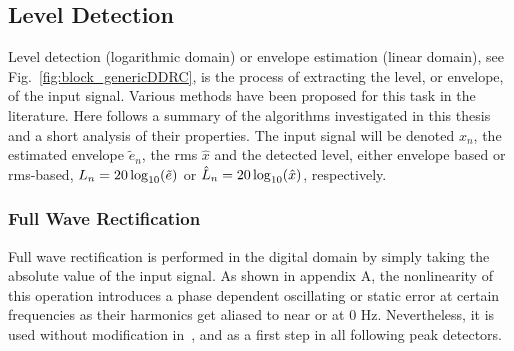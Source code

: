 \documentclass[../main2.tex]{subfiles}
\begin{document}
\subsection{Level Detection}\label{level_detection}
Level detection (logarithmic domain) or envelope estimation (linear domain), see Fig.~\ref{fig:block_genericDDRC}, is the process of extracting the level, or envelope, of the input signal. Various methods have been proposed for this task in the literature. Here follows a summary of the algorithms investigated in this thesis and a short analysis of their properties. The input signal will be denoted $x_n$, the estimated envelope $\tilde{e}_n$, the rms $\hat{x}$ and the detected level, either envelope based or rms-based, $L_n = 20\log_{10}(\tilde{e})$ or $\hat{L}_n=20\log_{10}(\hat{x})$, respectively. 

\subsubsection{Full Wave Rectification}\label{full_wave_rect}
Full wave rectification is performed in the digital domain by simply taking the absolute value of the input signal. As shown in appendix A, the nonlinearity of this operation introduces a phase dependent oscillating or static error at certain frequencies as their harmonics get aliased to near or at 0 Hz. Nevertheless, it is used without modification in~\cite{reiss2012tutorial}, and as a first step in all following peak detectors.
\end{document}
